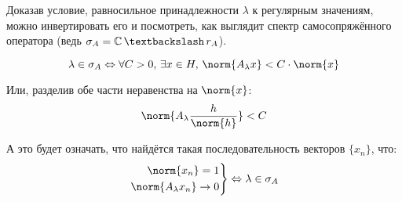 	Доказав условие, равносильное принадлежности $\lambda$ к регулярным значениям, можно инвертировать его и посмотреть,
	как выглядит спектр самосопряжённого оператора%
	(ведь $\sigma_A = \mathbb{C} \,\textbackslash\, r_A$).
	
	$$\lambda \in \sigma_A \Leftrightarrow \forall C > 0,\, \exists x \in H,\, \norm{A_{\lambda}x} < C\cdot\norm{x}$$
	
	Или, разделив обе части неравенства на $\norm{x}$:
	$$\norm{A_{\lambda} \dfrac{h}{\norm{h}}} < C$$
	
	А это будет означать, что найдётся такая последовательность векторов $\{x_n\}$, что:
	$$
		\left.
		\begin{aligned}
			\norm{x_n} = 1 \\
			\norm{A_{\lambda}x_n} \rightarrow 0
		\end{aligned}
		\right\}
		\Leftrightarrow
		\lambda \in \sigma_A
	$$

